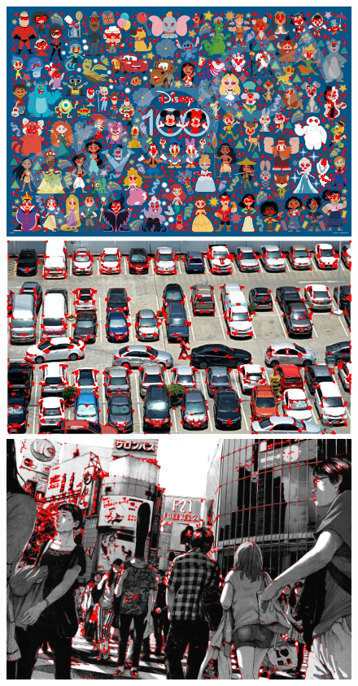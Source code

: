 \begin{figure}[H]
	\centering
	\begin{minipage}[b]{0.3\textwidth}
		\centering
		\includegraphics[width=\textwidth]{Graphics/bordes_disney.jpg}
	\end{minipage}
	\hfill
	\begin{minipage}[b]{0.3\textwidth}
		\centering
		\includegraphics[width=\textwidth]{Graphics/bordes_cars.jpg}
	\end{minipage}
	\hfill
	\begin{minipage}[b]{0.3\textwidth}
		\centering
		\includegraphics[width=\textwidth]{Graphics/bordes_japan.jpg}

\end{minipage}
\end{figure}
